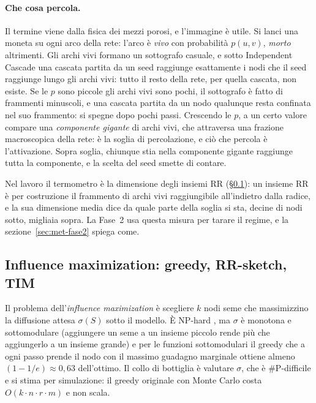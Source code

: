 \documentclass[11pt,a4paper]{article}
\begin{document}
\paragraph{Che cosa percola.} Il termine viene dalla fisica dei mezzi porosi, e l'immagine è utile. Si lanci una moneta su ogni arco della rete: l'arco è \emph{vivo} con probabilità $p(u,v)$, \emph{morto} altrimenti. Gli archi vivi formano un sottografo casuale, e sotto Independent Cascade una cascata partita da un seed raggiunge esattamente i nodi che il seed raggiunge lungo gli archi vivi: tutto il resto della rete, per quella cascata, non esiste. Se le $p$ sono piccole gli archi vivi sono pochi, il sottografo è fatto di frammenti minuscoli, e una cascata partita da un nodo qualunque resta confinata nel suo frammento: si spegne dopo pochi passi. Crescendo le $p$, a un certo valore compare una \emph{componente gigante} di archi vivi, che attraversa una frazione macroscopica della rete: è la soglia di percolazione, e ciò che percola è l'attivazione. Sopra soglia, chiunque stia nella componente gigante raggiunge tutta la componente, e la scelta del seed smette di contare.

Nel lavoro il termometro è la dimensione degli insiemi RR (\S\ref{sec:bg-im}): un insieme RR è per costruzione il frammento di archi vivi raggiungibile all'indietro dalla radice, e la sua dimensione media dice da quale parte della soglia si sta, decine di nodi sotto, migliaia sopra. La Fase~2 usa questa misura per tarare il regime, e la sezione~\ref{sec:met-fase2} spiega come.

\subsection{Influence maximization: greedy, RR-sketch, TIM}
\label{sec:bg-im}
Il problema dell'\emph{influence maximization} \citep{kempe2003} è scegliere $k$ nodi seme che massimizzino la diffusione attesa $\sigma(S)$ sotto il modello. È NP-hard \citep{kempe2003}, ma $\sigma$ è monotona e sottomodulare (aggiungere un seme a un insieme piccolo rende più che aggiungerlo a un insieme grande) e per le funzioni sottomodulari il greedy che a ogni passo prende il nodo con il massimo guadagno marginale ottiene almeno $(1 - 1/e) \approx 0{,}63$ dell'ottimo. Il collo di bottiglia è valutare $\sigma$, che è \#P-difficile e si stima per simulazione: il greedy originale con Monte Carlo costa $O(k \cdot n \cdot r \cdot m)$ e non scala.
\end{document}
